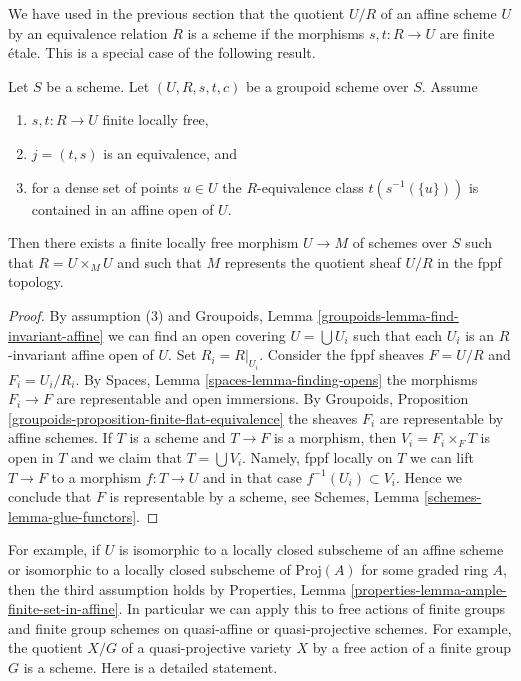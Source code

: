 \noindent
We have used in the previous section that the quotient $U/R$ of an
affine scheme $U$ by an equivalence relation $R$ is a scheme if the
morphisms $s, t : R \to U$ are finite \'etale. This is a special case
of the following result.

\begin{proposition}
\label{proposition-finite-flat-equivalence-global}
Let $S$ be a scheme.
Let $(U, R, s, t, c)$ be a groupoid scheme over $S$.
Assume
\begin{enumerate}
\item $s, t : R \to U$ finite locally free,
\item $j = (t, s)$ is an equivalence, and
\item for a dense set of points $u \in U$ the $R$-equivalence class
$t(s^{-1}(\{u\}))$ is contained in an affine open of $U$.
\end{enumerate}
Then there exists a finite locally free morphism $U \to M$
of schemes over $S$ such that $R = U \times_M U$ and such that $M$
represents the quotient sheaf $U/R$ in the fppf topology.
\end{proposition}

\begin{proof}
By assumption (3) and
Groupoids, Lemma \ref{groupoids-lemma-find-invariant-affine}
we can find an open covering $U = \bigcup U_i$ such that each $U_i$
is an $R$-invariant affine open of $U$. Set $R_i = R|_{U_i}$.
Consider the fppf sheaves $F = U/R$ and $F_i = U_i/R_i$.
By Spaces, Lemma \ref{spaces-lemma-finding-opens} the morphisms
$F_i \to F$ are representable and open immersions.
By Groupoids, Proposition \ref{groupoids-proposition-finite-flat-equivalence}
the sheaves $F_i$ are representable by affine schemes.
If $T$ is a scheme and $T \to F$ is a morphism, then $V_i = F_i \times_F T$
is open in $T$ and we claim that $T = \bigcup V_i$. Namely,
fppf locally on $T$ we can lift $T \to F$ to a morphism
$f : T \to U$ and in that case $f^{-1}(U_i) \subset V_i$.
Hence we conclude that $F$ is representable by a scheme, see
Schemes, Lemma \ref{schemes-lemma-glue-functors}.
\end{proof}

\noindent
For example, if $U$ is isomorphic to a locally closed subscheme of an
affine scheme or isomorphic to a locally closed subscheme of
$\text{Proj}(A)$ for some graded ring $A$, then the third assumption holds by
Properties, Lemma \ref{properties-lemma-ample-finite-set-in-affine}.
In particular we can apply this to free actions of finite groups and
finite group schemes on quasi-affine or quasi-projective schemes.
For example, the quotient $X/G$ of a quasi-projective variety
$X$ by a free action of a finite group $G$ is a scheme. Here is a
detailed statement.

